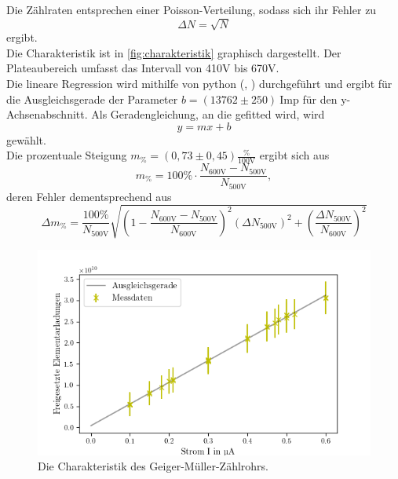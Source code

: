 Die Zählraten entsprechen einer Poisson-Verteilung, sodass sich ihr Fehler zu 
\begin{equation*}
  \Delta N = \sqrt{N}
\end{equation*}
ergibt.\\
Die Charakteristik ist in \autoref{fig:charakteristik} graphisch dargestellt.
Der Plateaubereich umfasst das Intervall von 410V bis 670V.\\
Die lineare Regression wird mithilfe von python (\cite{numpy}, \cite{uncertainties}) durchgeführt und ergibt
für die Ausgleichsgerade der Parameter $b = (13762 \pm 250)  \: \mathrm{Imp}$ für den y-Achsenabschnitt.
Als Geradengleichung, an die gefitted wird, wird 
\begin{equation*}
  y = mx + b
\end{equation*}
gewählt.\\
Die prozentuale Steigung $m_{\%} = (0,73 \pm 0,45) \mathrm{\frac{\%}{100 V}}$ ergibt sich aus 
\begin{equation*}
  m_{\%} = 100\% \cdot \frac{N_{\mathrm{600V}} - N_{\mathrm{500V}}}{N_{\mathrm{500V}}},
\end{equation*}
deren Fehler dementsprechend aus
\begin{equation*}
  \Delta m_{\%} = \frac{100\%}{N_{\mathrm{500V}}} \sqrt{(1 - \frac{N_{\mathrm{600V}} - N_{\mathrm{500V}}}{N_{\mathrm{600V}}})^2 (\Delta N_{\mathrm{500V}})^2 + (\frac{\Delta N_{\mathrm{500V}}}{N_{\mathrm{600V}}})^2}
\end{equation*}

\begin{figure}[H]
  \centering
  \includegraphics{content/hobelneu.png}
  \caption{Die Charakteristik des Geiger-Müller-Zählrohrs.}
  \label{fig:charakteristik}
\end{figure}


